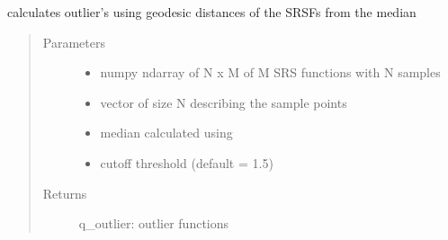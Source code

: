 \documentclass[letterpaper,10pt,english]{sphinxmanual}
\begin{document}
\begin{fulllineitems}
\label{\detokenize{utility_functions:utility_functions.outlier_detection}}
calculates outlier’s using geodesic distances of the SRSFs from the median
\begin{quote}\begin{description}
\item[{Parameters}] \leavevmode\begin{itemize}
\item {} 
 \textendash{} numpy ndarray of N x M of M SRS functions with N samples

\item {} 
 \textendash{} vector of size N describing the sample points

\item {} 
 \textendash{} median calculated using {\hyperref[\detokenize{time_warping:time_warping.srsf_align}]{}}

\item {} 
 \textendash{} cutoff threshold (default = 1.5)

\end{itemize}

\item[{Returns}] \leavevmode
q\_outlier: outlier functions

\end{description}\end{quote}

\end{fulllineitems}

\end{document}

